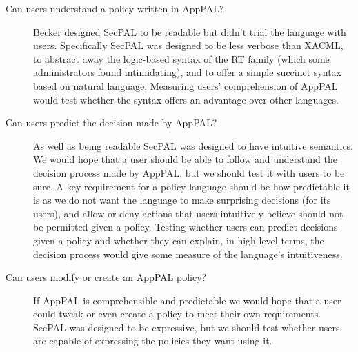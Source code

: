 \documentclass[thesis.tex]{subfiles}
\begin{document}
\begin{description}
\item[Can users understand a policy written in AppPAL?] Becker
  designed SecPAL to be readable but didn't trial the language with users.
  Specifically SecPAL was designed to be less verbose than XACML, to abstract away
  the logic-based syntax of the RT family (which some administrators found
  intimidating), and to offer a simple succinct syntax based on natural language.
  Measuring users' comprehension of AppPAL would test whether the syntax offers an
  advantage over other languages.

\item[Can users predict the decision made by AppPAL?] As well as being
  readable SecPAL was designed to have intuitive semantics. We would
  hope that a user should be able to follow and understand the decision
  process made by AppPAL, but we should test it with users to be sure. A
  key requirement for a policy language should be how predictable it is
  as we do not want the language to make surprising decisions (for its
  users), and allow or deny actions that users intuitively believe
  should not be permitted given a policy. Testing whether users can
  predict decisions given a policy and whether they can explain, in
  high-level terms, the decision process would give some measure of the
  language's intuitiveness.
  
\item[Can users modify or create an AppPAL policy?] If AppPAL is
  comprehensible and predictable we would hope that a user could tweak
  or even create a policy to meet their own requirements. SecPAL was
  designed to be expressive, but we should test whether users are
  capable of expressing the policies they want using it.
\end{description}
\end{document}
